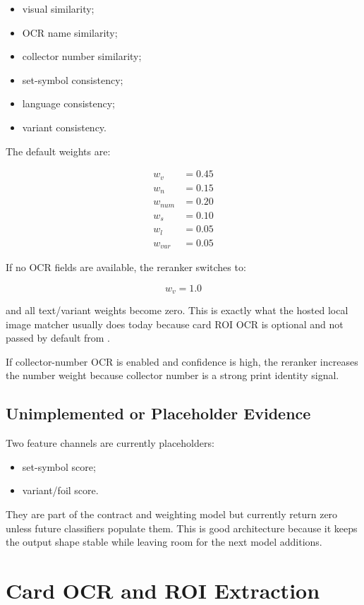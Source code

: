\documentclass[11pt,a4paper]{article}
\begin{document}
\begin{itemize}
  \item visual similarity;
  \item OCR name similarity;
  \item collector number similarity;
  \item set-symbol consistency;
  \item language consistency;
  \item variant consistency.
\end{itemize}

The default weights are:

\[
\begin{aligned}
w_v &= 0.45\\
w_n &= 0.15\\
w_{num} &= 0.20\\
w_s &= 0.10\\
w_l &= 0.05\\
w_{var} &= 0.05
\end{aligned}
\]

If no OCR fields are available, the reranker switches to:

\[
w_v = 1.0
\]

and all text/variant weights become zero. This is exactly what the hosted local image matcher usually does today because card ROI OCR is optional and not passed by default from .

If collector-number OCR is enabled and confidence is high, the reranker increases the number weight because collector number is a strong print identity signal.

\subsection{Unimplemented or Placeholder Evidence}

Two feature channels are currently placeholders:

\begin{itemize}
  \item set-symbol score;
  \item variant/foil score.
\end{itemize}

They are part of the contract and weighting model but currently return zero unless future classifiers populate them. This is good architecture because it keeps the output shape stable while leaving room for the next model additions.

\section{Card OCR and ROI Extraction}
\end{document}
